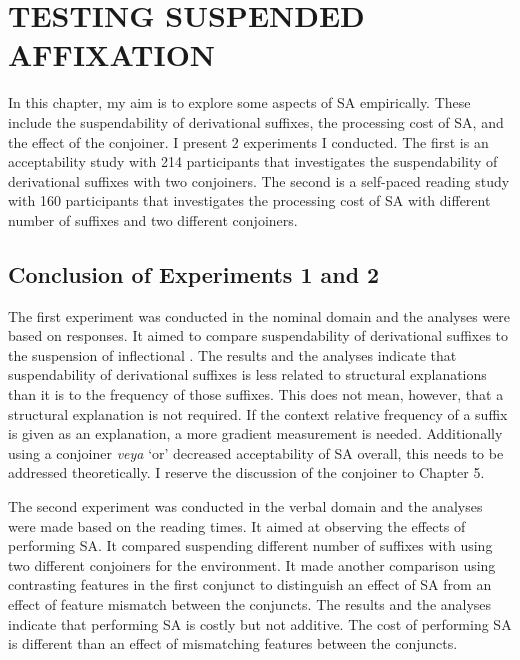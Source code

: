 \chapter{\MakeUppercase{testing suspended affixation}} \label{sec:testing}


In this chapter, my aim is to explore some aspects of SA empirically. These include the suspendability of derivational suffixes, the processing cost of SA, and the effect of the conjoiner. I present 2 experiments I conducted. The first is an acceptability study with 214 participants that investigates the suspendability of derivational suffixes with two conjoiners. The second is a self-paced reading study with 160 participants that investigates the processing cost of SA with different number of suffixes and two different conjoiners.






\section{Conclusion of Experiments 1 and 2}

The first experiment was conducted in the nominal domain and the analyses were based on responses. It aimed to compare suspendability of derivational suffixes to the suspension of inflectional {\Acc}. The results and the analyses indicate that suspendability of derivational suffixes is less related to structural explanations than it is to the frequency of those suffixes. This does not mean, however, that a structural explanation is not required. If the context relative frequency of a suffix is given as an explanation, a more gradient measurement is needed. Additionally using a conjoiner \textit{veya} `or' decreased acceptability of SA overall, this needs to be addressed theoretically. I reserve the discussion of the conjoiner to Chapter 5.


The second experiment was conducted in the verbal domain and the analyses were made based on the reading times. It aimed at observing the effects of performing SA. It compared suspending different number of suffixes with using two different conjoiners for the environment. It made another comparison using contrasting features in the first conjunct to distinguish an effect of SA from an effect of feature mismatch between the conjuncts. The results and the analyses indicate that performing SA is costly but not additive. The cost of performing SA is different than an effect of mismatching features between the conjuncts. 









